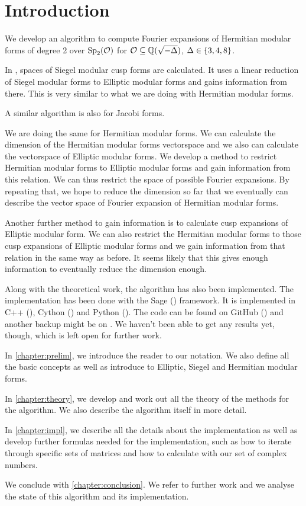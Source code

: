
\section{Introduction}

We develop an algorithm to compute Fourier expansions of Hermitian modular forms of degree 2 over $\operatorname{Sp}_2(\mathcal{O})$ for $\mathcal{O} \subseteq \mathbb{Q}(\sqrt{-\Delta})$, $\Delta \in \Set{3,4,8}$.

In \cite{PoorYuen07Comp}, spaces of Siegel modular cusp forms are calculated. It uses a linear reduction of Siegel modular forms to Elliptic modular forms and gains information from there. This is very similar to what we are doing with Hermitian modular forms.

A similar algorithm is also \cite[Algorithm 4.3]{Raum12Jacobi} for Jacobi forms.

We are doing the same for Hermitian modular forms. We can calculate the dimension of the Hermitian modular forms vectorspace and we also can calculate the vectorspace of Elliptic modular forms. We develop a method to restrict Hermitian modular forms to Elliptic modular forms and gain information from this relation. We can thus restrict the space of possible Fourier expansions. By repeating that, we hope to reduce the dimension so far that we eventually can describe the vector space of Fourier expansion of Hermitian modular forms.

Another further method to gain information is to calculate cusp expansions of Elliptic modular form. We can also restrict the Hermitian modular forms to those cusp expansions of Elliptic modular forms and we gain information from that relation in the same way as before. It seems likely that this gives enough information to eventually reduce the dimension enough.

Along with the theoretical work, the algorithm has also been implemented. The implementation has been done with the Sage (\cite{sage}) framework. It is implemented in C++ (\cite{cpp}), Cython (\cite{cython}) and Python (\cite{python}). The code can be found on GitHub (\cite{Zeyer13Github}) and another backup might be on \cite{Zeyer13Homepage}. We haven't been able to get any results yet, though, which is left open for further work.

In \cref{chapter:prelim}, we introduce the reader to our notation. We also define all the basic concepts as well as introduce to Elliptic, Siegel and Hermitian modular forms.

In \cref{chapter:theory}, we develop and work out all the theory of the methods for the algorithm. We also describe the algorithm itself in more detail.

In \cref{chapter:impl}, we describe all the details about the implementation as well as develop further formulas needed for the implementation, such as how to iterate through specific sets of matrices and how to calculate with our set of complex numbers.

We conclude with \cref{chapter:conclusion}. We refer to further work and we analyse the state of this algorithm and its implementation.
